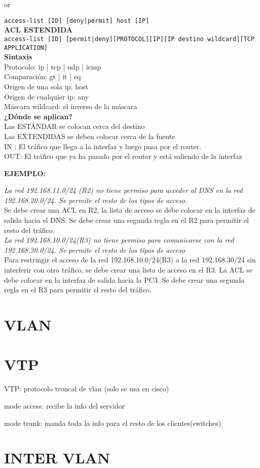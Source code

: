 \documentclass[letterpaper,12pt]{article}
\begin{document}
\begin{sloppypar}
or

\texttt{access-list [ID] [deny|permit] host [IP]}
\vspace{0.3cm}\\ 
\textbf{ACL ESTENDIDA}\\
\texttt{access-list [ID] [permit|deny][PROTOCOL][IP][IP destino wildcard][TCP APPLICATION]}
\vspace{0.3cm}\\ 
\textbf{Sintaxis} \\ 
Protocolo: ip | tcp | udp | icmp \\ 
Comparación: gt | it | eq \\ 
Origen de una sola ip: host \\ 
Origen de cualquier ip: any \\ 
Máscara wildcard: el inverso de la máscara\\ 
\textbf{¿Dónde se aplican?} \\ 
Las ESTÁNDAR se colocan cerca del destino \\ 
Las EXTENDIDAS se deben colocar cerca de la fuente \\
IN : El tráfico que llega a la interfaz y luego pasa por el router. \\ 
OUT: El tráfico que ya ha pasado por el router y está saliendo de la interfaz

\textbf{EJEMPLO:}

\textit{La red 192.168.11.0/24 (R2) no tiene permiso para acceder al DNS en la red 192.168.20.0/24. Se permite el resto de los tipos de acceso.} \\ 
Se debe crear una ACL en R2, la lista de acceso se debe colocar en la interfaz de salida hacia el DNS. Se debe crear una segunda regla en el R2 para permitir el resto del tráfico.\\ 
\textit{La red 192.168.10.0/24(R3) no tiene permiso para comunicarse con la red 192.168.30.0/24. Se permite el resto de los tipos de acceso}
\vspace{0.3cm}\\ 
Para restringir el acceso de la red 192.168.10.0/24(R3) a la red 192.168.30/24 sin interferir con otro tráfico, se
debe crear una lista de acceso en el R3. La ACL se debe colocar en la interfaz de salida hacia la PC3.
Se debe crear una segunda regla en el R3 para permitir el resto del tráfico.
\newpage
\section{VLAN}
\section{VTP}
VTP: protocolo troncal de vlan (solo se usa en cisco)

mode access: recibe la info del servidor

mode trunk: manda toda la info para el resto de los clientes(switches)
\newpage
\section{INTER VLAN}

\end{sloppypar}
\end{document}
